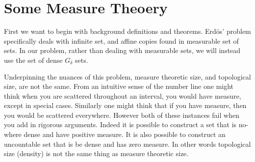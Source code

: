 \section{Some Measure Theoery}

First we want to begin with background definitions and theorems.  Erd\"{o}s' problem specifically deals with infinite set, and affine copies found in measurable set of sets.  In our problem, rather than dealing with measurable sets, we will instead use the set of dense $G_\delta$ sets.  

Underpinning the nuances of this problem, measure theoretic size, and topological size, are not the same. From an intuitive sense of the number line one might think when you are scattered throughout an interval, you would have measure, except in special cases. Similarly one might think that if you have measure, then you would be scattered everywhere.  However both of these instances fail when you add in rigorous arguments.  Indeed it is possible to construct a set that is no-where dense and have positive measure.  It is also possible to construct an uncountable set that is be dense and has zero measure. In other words topological size (density) is not the same thing as measure theoretic size. 

